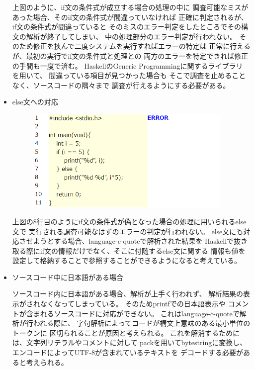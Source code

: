 \documentclass{csspaper}
\begin{document}
\begin{itemize}
         上図のように、if文の条件式が成立する場合の処理の中に
         調査可能なミスがあった場合、そのif文の条件式が間違っていなければ
         正確に判定されるが、if文の条件式が間違っていると
         そのミスのエラー判定をしたところでその構文の解析が終了してしまい、
         中の処理部分のエラー判定が行われない。
         そのため修正を挟んで二度システムを実行すればエラーの特定は
         正常に行えるが、最初の実行でif文の条件式と処理との
         両方のエラーを特定できれば修正の手間も一度で済む。
         HaskellのGeneric Programmingに関するライブラリ \cite{14}を用いて、
         間違っている項目が見つかった場合も
         そこで調査を止めることなく、ソースコードの隅々まで
         調査が行えるようにする必要がある。

         \item else文への対応
         
         \begin{figure}[h]
            \centering
            \includegraphics[width=10cm]{sample8.png}
         \end{figure}

         上図の8行目のようにif文の条件式が偽となった場合の処理に用いられるelse文で
         実行される調査可能なはずのエラーの判定が行われない。
         else文にも対応させようとする場合、language-c-quoteで解析された結果を
         Haskellで抜き取る際にif文の情報だけでなく、そこに付随するelse文に関する
         情報も値を設定して格納することで参照することができるようになると考えている。

         \item ソースコード中に日本語がある場合
         
         ソースコード内に日本語がある場合、解析が上手く行われず、
         解析結果の表示がされなくなってしまっている。
         そのためprintfでの日本語表示や
         コメントが含まれるソースコードに対応ができない。
         これはlanguage-c-quoteで解析が行われる際に、
         字句解析によってコードが構文上意味のある最小単位のトークンに
         区切られることが原因と考えられる。
         これを解消するためには、文字列リテラルやコメントに対して
         packを用いてbytestringに変換し、
         エンコードによってUTF-8が含まれているテキストを
         デコードする必要があると考えられる。


\end{itemize}
\end{document}
